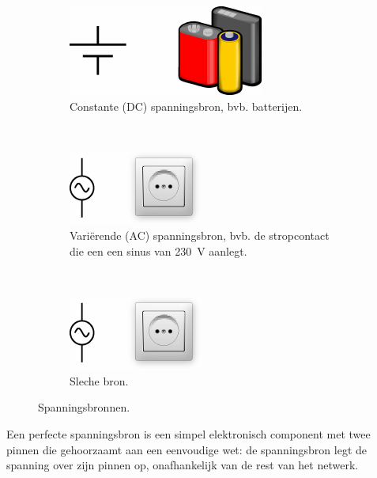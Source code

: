 \documentclass{article}
\begin{document}
			\begin{figure}[hbtp]
				\centering
				\begin{subfigure}[b]{0.25\linewidth}
					\centering
					\includegraphics[width=\linewidth]{vc}
					\caption{Constante (DC) spanningsbron, bvb. batterijen.}
				\end{subfigure}
				~
				\begin{subfigure}[b]{0.25\linewidth}
					\centering
					\includegraphics[width=\linewidth]{vt}
					\caption{Vari\"erende (AC) spanningsbron, bvb. de stropcontact die een een sinus van 230~V aanlegt.}
				\end{subfigure}
				~
				\begin{subfigure}[b]{0.25\linewidth}
					\centering
					\includegraphics[width=\linewidth]{vt}
					\caption{Sleche bron.}
				\end{subfigure}

				\caption{Spanningsbronnen.}
				\label{fig:vbron}
			\end{figure}
			 Een perfecte spanningsbron is een simpel elektronisch component met twee pinnen die gehoorzaamt aan een eenvoudige wet: de spanningsbron legt de spanning over zijn pinnen op, onafhankelijk van de rest van het netwerk.
			 
\end{document}
